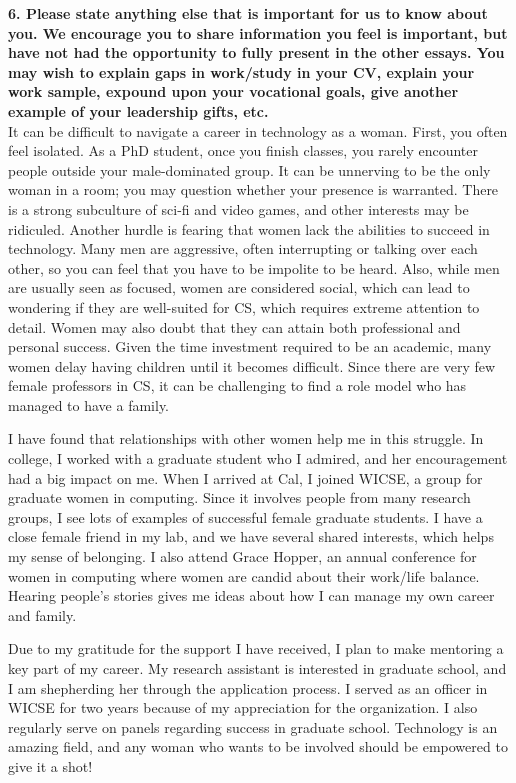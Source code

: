 \documentclass{article}
\begin{document}
\pagestyle{plain}

\noindent\textbf{6.  Please state anything else that is important for us to know about you. We encourage you to share information you feel is important, but have not had the opportunity to fully present in the other essays. You may wish to explain gaps in work/study in your CV, explain your work sample, expound upon your vocational goals, give another example of your leadership gifts, etc.}\\

It can be difficult to navigate a career in technology as a woman.
First, you often feel isolated.
As a PhD student, once you finish classes, you rarely encounter people outside your male-dominated group.
It can be unnerving to be the only woman in a room; you may question whether your presence is warranted.
There is a strong subculture of sci-fi and video games, and other interests may be ridiculed.
Another hurdle is fearing that women lack the abilities to succeed in technology.
Many men are aggressive, often interrupting or talking over each other, so you can feel that you have to be impolite to be heard.
Also, while men are usually seen as focused, women are considered social, which can lead to wondering if they are well-suited for CS, which requires extreme attention to detail.
Women may also doubt that they can attain both professional and personal success.
Given the time investment required to be an academic, many women delay having children until it becomes difficult.
Since there are very few female professors in CS, it can be challenging to find a role model who has managed to have a family.

I have found that relationships with other women help me in this struggle.
In college, I worked with a graduate student who I admired, and her encouragement had a big impact on me.
When I arrived at Cal, I joined WICSE, a group for graduate women in computing.
Since it involves people from many research groups, I see lots of examples of successful female graduate students.
I have a close female friend in my lab, and we have several shared interests, which helps my sense of belonging.
I also attend Grace Hopper, an annual conference for women in computing where women are candid about their work/life balance.
Hearing people's stories gives me ideas about how I can manage my own career and family.

Due to my gratitude for the support I have received, I plan to make mentoring a key part of my career.
My research assistant is interested in graduate school, and I am shepherding her through the application process.
I served as an officer in WICSE for two years because of my appreciation for the organization.
I also regularly serve on panels regarding success in graduate school.
Technology is an amazing field, and any woman who wants to be involved should be empowered to give it a shot!
\end{document}
